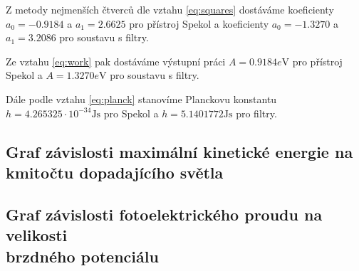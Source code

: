 \documentclass[titlepage]{article}
\begin{document}
Z metody nejmenších čtverců dle vztahu \eqref{eq:squares} dostáváme koeficienty $a_0 = -0.9184$ a $a_1 = 2.6625$ pro přístroj Spekol a koeficienty $a_0 = -1.3270$ a $a_1 = 3.2086$ pro soustavu s filtry.

Ze vztahu \eqref{eq:work} pak dostáváme výstupní práci $A = 0.9184 \si{e\volt}$ pro přístroj Spekol a $A = 1.3270 \si{e\volt}$ pro soustavu s filtry.

Dále podle vztahu \eqref{eq:planck} stanovíme Planckovu konstantu $h = 4.265325 \cdot 10^{-34} \si{\joule\second}$ pro Spekol a $h = 5.1401772 \si{\joule\second}$ pro filtry.

\subsection{Graf závislosti maximální kinetické energie na \\kmitočtu dopadajícího světla}
\begin{figure}[h]
\centering
{}
\end{figure}

\subsection{Graf závislosti fotoelektrického proudu na velikosti \\brzdného potenciálu}
\end{document}
